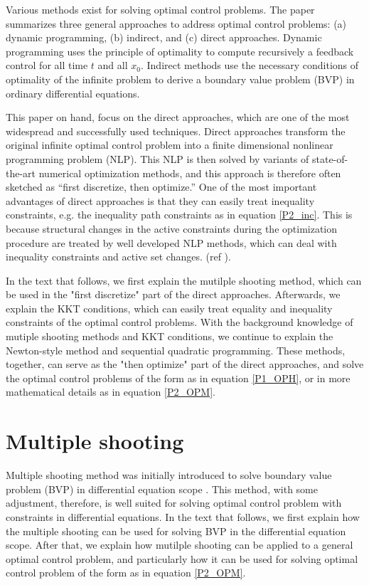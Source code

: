 \documentclass  [
  paper    = a4,
  BCOR     = 10mm,
  twoside,
  fontsize = 12pt,
  fleqn,
  toc      = bibnumbered,
  toc      = listofnumbered,
  numbers  = noendperiod,
  headings = normal,
  listof   = leveldown,
  version  = 3.03
]                                       {scrreprt}
\newcommand{\<}{\langle}
\renewcommand{\>}{\rangle}
\begin{document}
Various methods exist for solving optimal control problems. The paper \cite{MHHP05} summarizes three general approaches to address optimal control problems: (a) dynamic programming, (b) indirect, and (c) direct approaches. Dynamic programming uses the principle of optimality to compute recursively a feedback control for all time $t$ and all $x_0$.  Indirect methods use the necessary conditions of optimality of the infinite problem to derive a boundary value problem (BVP) in ordinary differential equations. 

This paper on hand, focus on the direct approaches, which are one of the most widespread and successfully used techniques. Direct approaches transform the original infinite optimal control problem into a finite dimensional nonlinear programming problem (NLP). This NLP is then solved by variants of state-of-the-art numerical optimization methods, and this approach is therefore often sketched as “first discretize, then optimize.” One of the most important advantages of direct approaches is that they can easily treat inequality constraints, e.g. the inequality path constraints as in equation \ref{P2_inc}. This is because structural changes in the active constraints during the optimization procedure are treated by well developed NLP methods,  which can deal with inequality constraints and active set changes. (ref \cite{MHHP05}).

In the text that follows, we first explain the mutilple shooting method, which can be used in the "first discretize" part of the direct approaches. Afterwards, we explain the KKT conditions, which can easily treat equality and inequality constraints of the optimal control problems. With the background knowledge of mutiple shooting methods and KKT conditions, we continue to explain the Newton-style method and sequential quadratic programming. These methods, together, can serve as the "then optimize" part of the  direct approaches, and solve the optimal control problems of the form as in equation \ref{P1_OPH}, or in more mathematical details as in equation \ref{P2_OPM}.


\section{Multiple shooting}
Multiple shooting method was initially introduced to solve boundary value problem (BVP) in differential equation scope \cite{DJJ62}. This method, with some adjustment, therefore, is well suited for solving optimal control problem with constraints in differential equations. In the text that follows, we first explain how the multiple shooting can be used for solving BVP in the differential equation scope. After that, we explain how mutilple shooting can be applied to a general optimal control problem, and particularly how it can be used for solving optimal control problem of the form as in equation \ref{P2_OPM}.
\end{document}
